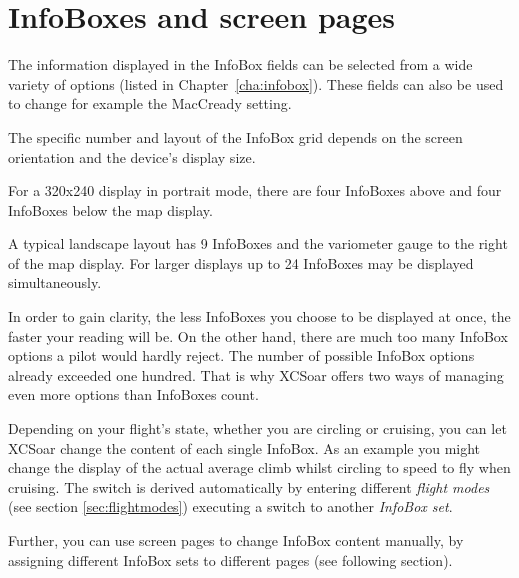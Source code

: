 \section{InfoBoxes and screen pages}\label{sec:infoboxandpages}

The information displayed in the InfoBox fields can be selected from a
wide variety of options (listed in Chapter~\ref{cha:infobox}). These
fields can also be used to change for example the MacCready setting.

The specific number and layout of the InfoBox grid depends on the
screen orientation and the device's display size.  

For a 320x240 display in portrait mode, there are four InfoBoxes above
and four InfoBoxes below the map display.

A typical landscape layout has 9 InfoBoxes and the variometer gauge 
to the right of the map display. 
For larger displays up to 24 InfoBoxes may be displayed simultaneously.  

In order to gain clarity, the less InfoBoxes you choose to be displayed at once,
the faster your reading will be. On the other hand, there are much too many 
InfoBox options a pilot would hardly reject. The number of possible InfoBox 
options already exceeded one hundred. That is why XCSoar offers two ways of 
managing even more options than InfoBoxes count.

Depending on your flight's state, whether you are circling or cruising, you can 
let XCSoar change the content of each single InfoBox. As an example you might 
change the display of the actual average climb whilst circling to speed to fly 
when cruising. The switch is derived automatically by entering different 
\emph{flight modes} (see section \ref{sec:flightmodes}) executing a switch to 
another \emph{InfoBox set}.

Further, you can use screen pages to change InfoBox content manually, by 
assigning different InfoBox sets to different pages (see following section).

